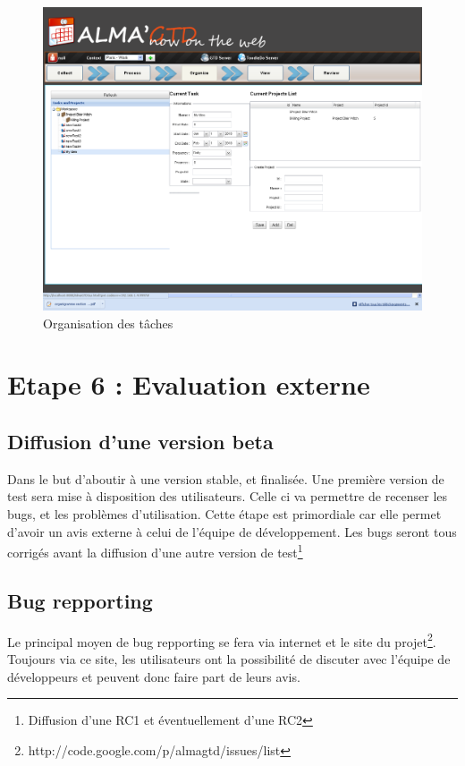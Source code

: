 \begin{figure}[H]
  \begin{center}
  \includegraphics[scale=0.5]{diagrams/A.png}
  \caption{Organisation des tâches}
  \end{center}
\end{figure}

\chapter{Etape 6 : Evaluation externe}
\section{Diffusion d'une version beta}
Dans le but d'aboutir à une version stable, et finalisée. Une première version de test sera mise à disposition des utilisateurs. Celle ci va permettre  de recenser les bugs, et les  problèmes d'utilisation. Cette étape est primordiale car elle permet d'avoir un avis externe à celui de l'équipe de développement. Les bugs seront tous corrigés avant la diffusion d'une autre version de test\footnote{Diffusion d'une RC1 et éventuellement d'une RC2}

\section{Bug repporting}
Le principal moyen de bug repporting se fera via internet et le site du projet\footnote{http://code.google.com/p/almagtd/issues/list}. Toujours via ce site, les utilisateurs ont la possibilité de discuter avec l'équipe de développeurs et peuvent donc faire part de leurs avis.


